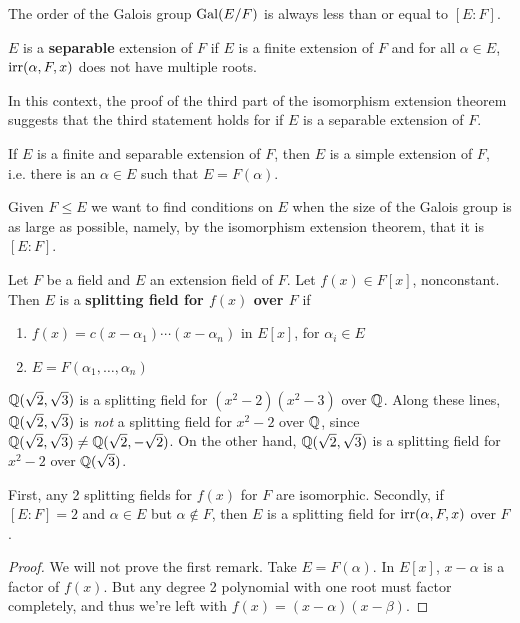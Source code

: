 \documentclass{../mathnotes}
\begin{document}
\begin{cor}
    The order of the Galois group $\operatorname{Gal}(E/F)$ is always less than or equal to $[E:F]$.
\end{cor}

\begin{defn}
    $E$ is a \textbf{separable} extension of $F$ if $E$ is a finite extension of $F$ and for all $\alpha\in E$,
    $\operatorname{irr}(\alpha,F,x)$ does not have multiple roots.
\end{defn}

In this context, the proof of the third part of the isomorphism extension theorem suggests that the third statement holds
for if $E$ is a separable extension of $F$.

\begin{rem}
    If $E$ is a finite and separable extension of $F$, then $E$ is a simple extension of $F$, i.e. there is an $\alpha\in E$
    such that $E=F(\alpha)$.
\end{rem}

Given $F\leq E$ we want to find conditions on $E$ when the size of the Galois group is as large as possible, namely, by the
isomorphism extension theorem, that it is $[E:F]$.

\begin{defn}
    Let $F$ be a field and $E$ an extension field of $F$. Let $f(x)\in F[x]$, nonconstant. Then $E$ is a \textbf{splitting field
    for $f(x)$ over $F$} if
    \begin{enumerate}
        \item $f(x)=c(x-\alpha_1)\cdots(x-\alpha_n)$ in $E[x]$, for $\alpha_i\in E$
        \item $E=F(\alpha_1,\ldots,\alpha_n)$
    \end{enumerate}
\end{defn}

\begin{exmp}
    $\mathbb{Q}(\sqrt{2},\sqrt{3})$ is a splitting field for $(x^2-2)(x^2-3)$ over $\mathbb{Q}$. Along these lines, $\mathbb{Q}(\sqrt{2},\sqrt{3})$ is \textit{not}
    a splitting field for $x^2-2$ over $\mathbb{Q}$, since $\mathbb{Q}(\sqrt{2},\sqrt{3})\neq \mathbb{Q}(\sqrt{2},-\sqrt{2})$. On the other hand, $\mathbb{Q}(\sqrt{2},\sqrt{3})$
    is a splitting field for $x^2-2$ over $\mathbb{Q}(\sqrt{3})$.
\end{exmp}

\begin{rem}
    First, any 2 splitting fields for $f(x)$ for $F$ are isomorphic. Secondly, if $[E:F]=2$ and $\alpha\in E$ but $\alpha\notin F$,
then $E$ is a splitting field for $\operatorname{irr}(\alpha,F,x)$ over $F$.
\end{rem}
\begin{proof}
    We will not prove the first remark. Take $E=F(\alpha)$. In $E[x]$, $x-\alpha$ is a factor of $f(x)$. But any degree 2 polynomial with
    one root must factor completely, and thus we're left with $f(x)=(x-\alpha)(x-\beta)$.
\end{proof}
\end{document}
